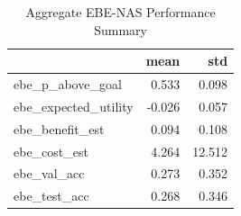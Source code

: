 \begin{table}
\caption{Aggregate EBE-NAS Performance Summary}
\label{tab:ebe_summary}
\begin{tabular}{lrr}
\toprule
 & mean & std \\
\midrule
ebe\_p\_above\_goal & 0.533 & 0.098 \\
ebe\_expected\_utility & -0.026 & 0.057 \\
ebe\_benefit\_est & 0.094 & 0.108 \\
ebe\_cost\_est & 4.264 & 12.512 \\
ebe\_val\_acc & 0.273 & 0.352 \\
ebe\_test\_acc & 0.268 & 0.346 \\
\bottomrule
\end{tabular}
\end{table}
